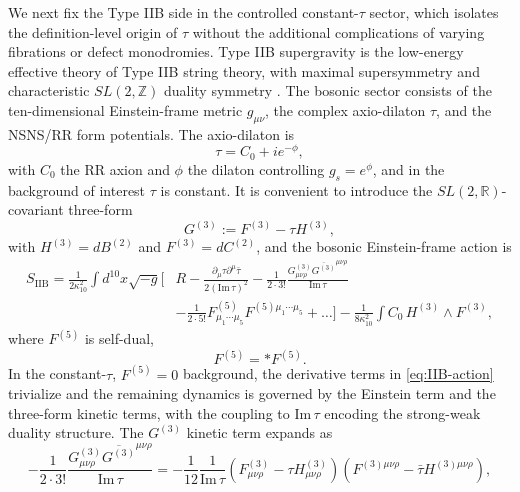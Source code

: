 \documentclass[11pt]{article}
\theoremstyle{remark}
\newcommand{\Z}{\mathbb{Z}}
\newcommand{\R}{\mathbb{R}}
\begin{document}
We next fix the Type IIB side in the controlled constant-\(\tau\) sector, which isolates the definition-level origin of \(\tau\) without the additional complications of varying fibrations or defect monodromies. Type IIB supergravity is the low-energy effective theory of Type IIB string theory, with maximal supersymmetry and characteristic \(SL(2,\Z)\) duality symmetry \cite{Schwarz1983, Schwarz1995}. The bosonic sector consists of the ten-dimensional Einstein-frame metric \(g_{\mu\nu}\), the complex axio-dilaton \(\tau\), and the NSNS/RR form potentials. The axio-dilaton is
\begin{equation}
\tau = C_0 + i e^{-\phi},
\end{equation}
with \(C_0\) the RR axion and \(\phi\) the dilaton controlling \(g_s=e^{\phi}\), and in the background of interest \(\tau\) is constant. It is convenient to introduce the \(SL(2,\R)\)-covariant three-form
\begin{equation}
G^{(3)} := F^{(3)} - \tau H^{(3)},
\end{equation}
with \(H^{(3)}=dB^{(2)}\) and \(F^{(3)}=dC^{(2)}\), and the bosonic Einstein-frame action is
\begin{equation}
\label{eq:IIB-action}
\begin{aligned}
S_{\mathrm{IIB}} = \frac{1}{2\kappa_{10}^{2}} \int d^{10}x \sqrt{-g} \Bigg[ & R - \frac{\partial_{\mu} \tau \partial^{\mu} \bar{\tau}}{2 (\mathrm{Im} \, \tau)^2} - \frac{1}{2 \cdot 3!} \frac{G^{(3)}_{\mu\nu\rho} \overline{G^{(3)}}^{\mu\nu\rho}}{\mathrm{Im}\, \tau} \\
& - \frac{1}{2 \cdot 5!} F^{(5)}_{\mu_1 \cdots \mu_5} F^{(5) \mu_1 \cdots \mu_5} + \ldots \Bigg] - \frac{1}{8 \kappa_{10}^2} \int C_0 \, H^{(3)} \wedge F^{(3)},
\end{aligned}
\end{equation}
where \(F^{(5)}\) is self-dual,
\begin{equation}
F^{(5)} = * F^{(5)}.
\end{equation}
In the constant-\(\tau\), \(F^{(5)}=0\) background, the derivative terms in \eqref{eq:IIB-action} trivialize and the remaining dynamics is governed by the Einstein term and the three-form kinetic terms, with the coupling to \(\mathrm{Im}\,\tau\) encoding the strong-weak duality structure. The \(G^{(3)}\) kinetic term expands as
\begin{equation}
-\frac{1}{2 \cdot 3!} \frac{G^{(3)}_{\mu\nu\rho} \overline{G^{(3)}}^{\mu\nu\rho}}{\mathrm{Im}\, \tau} = -\frac{1}{12} \frac{1}{\mathrm{Im}\, \tau} \left( F^{(3)}_{\mu\nu\rho} - \tau H^{(3)}_{\mu\nu\rho} \right) \left( F^{(3) \mu\nu\rho} - \bar{\tau} H^{(3) \mu\nu\rho} \right),
\end{equation}
\end{document}
